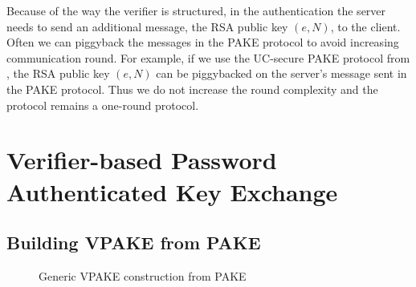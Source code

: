 Because of the way the verifier is structured, in the authentication the server needs to send an additional message, the RSA public key $(e,N)$, to the client. Often we can piggyback the messages in the PAKE protocol to avoid increasing communication round. 
For example, if we use the UC-secure PAKE protocol from \citet{Benhamouda2013}, the RSA public key $(e,N)$ can be piggybacked on the server's message sent in the PAKE protocol. Thus we do not increase the round complexity and the protocol remains a one-round protocol.


\section{Verifier-based Password Authenticated Key Exchange} \label{sec:vpake-pake}

\subsection{Building VPAKE from PAKE}

\begin{figure}[htbp]
\centering
{}
\caption{Generic VPAKE construction from PAKE}
\label{fig:genericVPAKE}
\end{figure}

